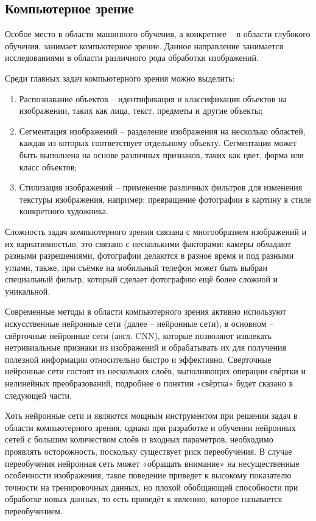 \documentclass[14pt, russian]{scrartcl}
\begin{document}
\subsection{Компьютерное зрение}
Особое место в области машинного обучения, а конкретнее -- в области глубокого обучения, занимает компьютерное зрение. Данное направление занимается исследованиями в области различного рода обработки изображений\cite{cv1}.

Среди главных задач компьютерного зрения можно выделить:
\begin{enumerate}
    \item Распознавание объектов -- идентификация и классификация объектов на изображении, таких как лица, текст, предметы и другие объекты;
    \item Сегментация изображений -- разделение изображения на несколько областей, каждая из которых соответствует отдельному объекту. Сегментация может быть выполнена на основе различных признаков, таких как цвет, форма или класс объектов;
    \item Стилизация изображений -- применение различных фильтров для изменения текстуры изображения, например: превращение фотографии в картину в стиле конкретного художника.
\end{enumerate}

Сложность задач компьютерного зрения связана с многообразием изображений и их вариативностью, это связано с несколькими факторами: камеры обладают разными разрешениями, фотографии делаются в разное время и под разными углами, также, при съёмке на мобильный телефон может быть выбран специальный фильтр, который сделает фотографию ещё более сложной и уникальной. 

Современные методы в области компьютерного зрения активно используют искусственные нейронные сети (далее -- нейронные сети), в основном -- свёрточные нейронные сети (англ. CNN), которые позволяют извлекать нетривиальные признаки из изображений и обрабатывать их для получения полезной информации относительно быстро и эффективно. Свёрточные нейронные сети состоят из нескольких слоёв, выполняющих операции свёртки и нелинейных преобразований, подробнее о понятии «свёртка» будет сказано в следующей части. 

Хоть нейронные сети и являются мощным инструментом при решении задач в области компьютерного зрения, однако при разработке и обучении нейронных сетей с большим количеством слоёв и входных параметров, необходимо проявлять осторожность, поскольку существует риск переобучения. В случае переобучения нейронная сеть может «обращать внимание» на несущественные особенности изображения, такое поведение приведет к высокому показателю точности на тренировочных данных, но плохой обобщающей способности при обработке новых данных, то есть приведёт к явлению, которое называется переобучением.
\end{document}
